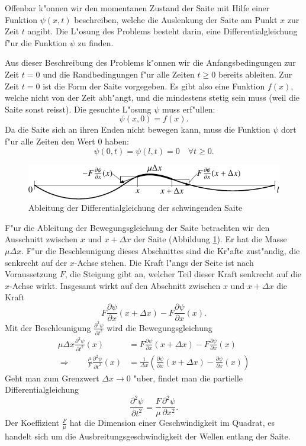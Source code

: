 Offenbar k"onnen wir den momentanen Zustand der Saite mit Hilfe einer
Funktion $\psi(x,t)$ beschreiben, welche die Auslenkung der Saite
am Punkt $x$ zur Zeit $t$ angibt. Die L"osung des Problems besteht darin,
eine Differentialgleichung f"ur die Funktion $\psi$ zu finden.

Aus dieser Beschreibung des Problems k"onnen wir die Anfangsbedingungen zur
Zeit $t=0$ und die Randbedingungen f"ur alle Zeiten $t\ge 0$ bereits ableiten.
Zur Zeit $t=0$ ist die Form der Saite vorgegeben. Es gibt also eine Funktion
$f(x)$, welche nicht von der Zeit abh"angt, und die mindestens stetig
sein muss (weil die Saite sonst reisst). Die gesuchte L"osung $\psi$
muss erf"ullen:
\[
\psi(x,0)=f(x).
\]
Da die Saite sich an ihren Enden nicht bewegen kann, muss die Funktion
$\psi$ dort f"ur alle Zeiten den Wert $0$ haben:
\[
\psi(0,t)=\psi(l,t)=0\quad\forall t\ge 0.
\]

\begin{figure}
\begin{center}
\includegraphics[width=\hsize]{images/saite-1}
\end{center}
\caption{Ableitung der Differentialgleichung der schwingenden Saite\label{saite}}
\end{figure}
F"ur die Ableitung der Bewegungsgleichung der Saite betrachten wir den
Ausschnitt zwischen $x$ und $x+\Delta x$ der Saite (Abbildung \ref{saite}).
Er hat die Masse
$\mu \Delta x$. F"ur die Beschleunigung dieses Abschnittes sind die
Kr"afte zust"andig, die senkrecht auf der $x$-Achse stehen. Die Kraft l"angs
der Seite ist nach Voraussetzung $F$, die Steigung gibt an, welcher Teil
dieser Kraft senkrecht auf die $x$-Achse wirkt. Insgesamt wirkt auf den
Abschnitt zwischen $x$ und $x+\Delta x$ die Kraft
\[
F\frac{\partial\psi}{\partial x}(x+\Delta x)-F\frac{\partial\psi}{\partial x}(x).
\]
Mit der Beschleunigung $\frac{\partial^2\psi}{\partial t^2}$ wird die
Bewegungsgleichung
\begin{align*}
\mu\Delta x\frac{\partial^2\psi}{\partial t^2}(x)&=
F\frac{\partial\psi}{\partial x}(x+\Delta x)-F\frac{\partial\psi}{\partial x}(x)\\
\Rightarrow\qquad
\frac{\mu}{F}\frac{\partial^2\psi}{\partial t^2}(x)&=
\frac1{\Delta x}\left(\frac{\partial\psi}{\partial x}(x+\Delta x)-\frac{\partial\psi}{\partial x}(x)\right)
\end{align*}
Geht man zum Grenzwert $\Delta x\to 0$ "uber, findet man die
partielle Differentialgleichung
\[
\frac{\partial^2\psi}{\partial t^2}=\frac{F}{\mu}\frac{\partial^2\psi}{\partial x^2}.
\]
Der Koeffizient $\frac{F}{\mu}$ hat die Dimension einer Geschwindigkeit im
Quadrat, es handelt sich um die Ausbreitungsgeschwindigkeit der Wellen entlang
der Saite.

